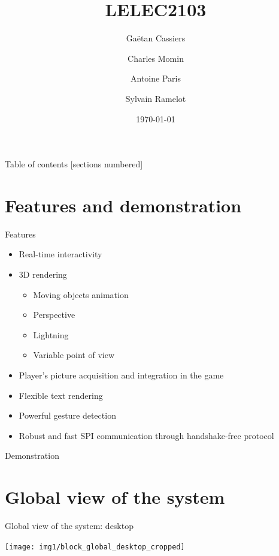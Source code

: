 \documentclass[10pt, notes]{beamer}
\title{LELEC2103}
\subtitle{}
\date{\today}
\author{Gaëtan Cassiers\and Charles Momin \and Antoine Paris \and Sylvain Ramelot}
\institute{Ecole polytechnique de Louvain}
\begin{document}
\maketitle
{}

\begin{frame}{Table of contents}
  [sections numbered]
  \tableofcontents%
\end{frame}


\section{Features and demonstration}
\begin{frame}{Features}
    \begin{itemize}
        \item Real-time interactivity
        \item 3D rendering
        \begin{itemize}
            \item Moving objects animation
            \item Perspective
            \item Lightning
            \item Variable point of view
        \end{itemize}
        \item Player's picture acquisition and integration in the game
        \item Flexible text rendering
        \item Powerful gesture detection
        \item Robust and fast SPI communication through handshake-free protocol
    \end{itemize}
\end{frame}

\begin{frame}{Demonstration}
\end{frame}

\section{Global view of the system}
\begin{frame}{Global view of the system: desktop}
    \begin{center}
        \texttt{[image: img1/block\_global\_desktop\_cropped]}
    \end{center}
\end{frame}
\end{document}
